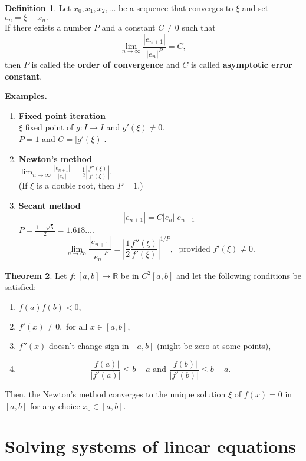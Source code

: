 \documentclass[12pt]{article}
\theoremstyle{definition}
\newtheorem{thm}{Theorem}
\newtheorem{defn}[thm]{Definition}
\begin{document}
\begin{defn} 
	Let $x_0, x_1, x_2, \ldots$ be a sequence that converges to $\xi$ and set $e_n = \xi - x_n.$\\
	If there exists a number $P$ and a constant $C \neq 0$ such that
	\[\lim_{n\to \infty}\frac{|e_{n+1}|}{|e_n|^P} = C,\]
	then $P$ is called the \textbf{order of convergence} and $C$ is called \textbf{asymptotic error constant}.
\end{defn}

\textbf{Examples.}
\begin{enumerate} 
	\item \textbf{Fixed point iteration}\\
	$\xi$ fixed point of $g:I\to I$ and $g'(\xi) \neq 0.$\\
	$P = 1$ and $C = |g'(\xi)|.$
	\item \textbf{Newton's method}\\
	$\displaystyle\lim_{n\to \infty}\frac{|e_{n+1}|}{|e_n|} = \frac{1}{2}\left|\frac{f''(\xi)}{f'(\xi)}\right|.$\\
	(If $\xi$ is a double root, then $P = 1.$)
	\item \textbf{Secant method}
	\[|e_{n+1}| = C|e_n||e_{n-1}|\]
	$P = \frac{1 + \sqrt{5}}{2} = 1.618\ldots.$\\
	\[\lim_{n\to \infty}\frac{|e_{n+1}|}{|e_n|^P} = \left|\frac{1}{2}\frac{f''(\xi)}{f'(\xi)}\right|^{1/P},\;\text{ provided }f'(\xi) \neq 0.\]
\end{enumerate}

\begin{thm} 
	Let $f:[a, b] \to \mathbb{R}$ be in $C^2[a, b]$ and let the following conditions be satisfied:
	\begin{enumerate}[nosep] 
		\item $f(a)f(b) < 0,$
		\item $f'(x) \neq 0,$ for all $x \in [a, b],$
		\item $f''(x)$ doesn't change sign in $[a, b]$ (might be zero at some points),
		\item 
		\[\frac{|f(a)|}{|f'(a)|} \le b - a \text{ and }\frac{|f(b)|}{|f'(b)|} \le b - a.\]
	\end{enumerate}
	Then, the Newton's method converges to the unique solution $\xi$ of $f(x) = 0$ in $[a, b]$ for any choice $x_0 \in [a, b].$
\end{thm}

\section{Solving systems of linear equations}
\end{document}
